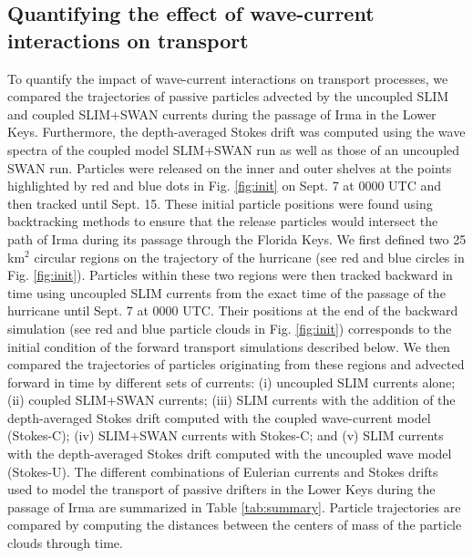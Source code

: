 \subsection{Quantifying the effect of wave-current interactions on transport}\label{sec:traj}

To quantify the impact of wave-current interactions on transport processes, we compared the trajectories of passive particles advected by the uncoupled SLIM and coupled SLIM+SWAN currents during the passage of Irma in the Lower Keys. Furthermore, the depth-averaged Stokes drift was computed using the wave spectra of the coupled model SLIM+SWAN run as well as those of an uncoupled SWAN run. Particles were released on the inner and outer shelves at the points highlighted by red and blue dots in Fig. \ref{fig:init} on Sept. 7 at 0000 UTC and then tracked until Sept. 15. These initial particle positions were found using backtracking methods \citep{spivakovskaya2005simulation} to ensure that the release particles would intersect the path of Irma during its passage through the Florida Keys. We first defined two 25 km$^\text{2}$ circular regions on the trajectory of the hurricane (see red and blue circles in Fig. \ref{fig:init}). Particles within these two regions were then tracked backward in time using uncoupled SLIM currents from the exact time of the passage of the hurricane until Sept. 7 at 0000 UTC. Their positions at the end of the backward simulation (see red and blue particle clouds in Fig. \ref{fig:init}) corresponds to the initial condition of the forward transport simulations described below. We then compared the trajectories of particles originating from these regions and advected forward in time by different sets of currents: (i) uncoupled SLIM currents alone; (ii) coupled SLIM+SWAN currents; (iii) SLIM currents with the addition of the depth-averaged Stokes drift computed with the coupled wave-current model (Stokes-C); (iv) SLIM+SWAN currents with Stokes-C; and (v) SLIM currents with the depth-averaged Stokes drift computed with the uncoupled wave model (Stokes-U). The different combinations of Eulerian currents and Stokes drifts used to model the transport of passive drifters in the Lower Keys during the passage of Irma are summarized in Table \ref{tab:summary}. Particle trajectories are compared by computing the distances between the centers of mass of the particle clouds through time.

